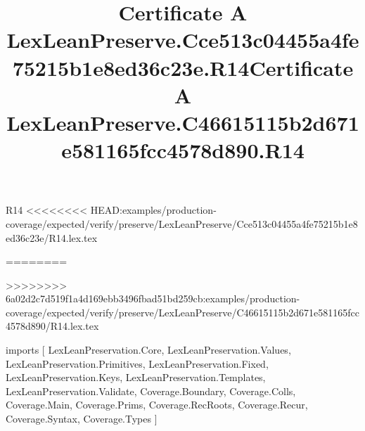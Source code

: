 \begin{lexlean}{R14}
<<<<<<<< HEAD:examples/production-coverage/expected/verify/preserve/LexLeanPreserve/Cce513c04455a4fe75215b1e8ed36c23e/R14.lex.tex
\title{Certificate A LexLeanPreserve.Cce513c04455a4fe75215b1e8ed36c23e.R14}
========
\title{Certificate A LexLeanPreserve.C46615115b2d671e581165fcc4578d890.R14}
>>>>>>>> 6a02d2c7d519f1a4d169ebb3496fbad51bd259cb:examples/production-coverage/expected/verify/preserve/LexLeanPreserve/C46615115b2d671e581165fcc4578d890/R14.lex.tex
\begin{coremodule}
imports [
  LexLeanPreservation.Core,
  LexLeanPreservation.Values,
  LexLeanPreservation.Primitives,
  LexLeanPreservation.Fixed,
  LexLeanPreservation.Keys,
  LexLeanPreservation.Templates,
  LexLeanPreservation.Validate,
  Coverage.Boundary,
  Coverage.Colls,
  Coverage.Main,
  Coverage.Prims,
  Coverage.RecRoots,
  Coverage.Recur,
  Coverage.Syntax,
  Coverage.Types
]


\end{coremodule}
\end{lexlean}
